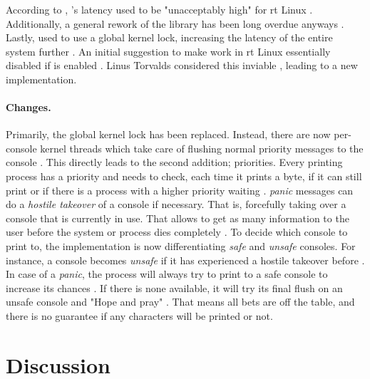 \documentclass[10pt,twocolumn,a4paper]{article}
\begin{document}
\subsubsection{}
According to \citeauthor{edge_discussion_2022}, 's latency used to be "unacceptably high" for \acrshort{rt} Linux \cite{edge_discussion_2022}.
Additionally, a general rework of the library has been long overdue anyways \cite{edge_discussion_2022}.
Lastly,  used to use a global kernel lock, increasing the latency of the entire system further \cite{gleixner_printk_2024}.
An initial suggestion to make  work in \acrshort{rt} Linux essentially disabled  if  is enabled \cite{mladek_printk_2022}.
Linus Torvalds considered this inviable \cite{torvalds_initial_2022}, leading to a new implementation.

\paragraph{Changes.}
Primarily, the global kernel lock has been replaced.
Instead, there are now per-console kernel threads which take care of flushing normal priority messages to the console \cite{gleixner_printk_2024}.
This directly leads to the second addition; priorities.
Every printing process has a priority and needs to check, each time it prints a byte, if it can still print or if there is a process with a higher priority waiting \cite{edge_discussion_2022}.
\emph{panic} messages can do a \emph{hostile takeover} of a console if necessary.
That is, forcefully taking over a console that is currently in use.
That allows to get as many information to the user before the system or process dies completely \cite{edge_discussion_2022}.
To decide which console to print to, the  implementation is now differentiating \emph{safe} and \emph{unsafe} consoles.
For instance, a console becomes \emph{unsafe} if it has experienced a hostile takeover before \cite{kernel_development_community_console}.
In case of a \emph{panic}, the process will always try to print to a safe console to increase its chances \cite{gleixner_printk_2024}.
If there is none available, it will try its final flush on an unsafe console and "Hope and pray" \cite{kernel_development_community_console}.
That means all bets are off the table, and there is no guarantee if any characters will be printed or not.

\section{Discussion}
\end{document}
